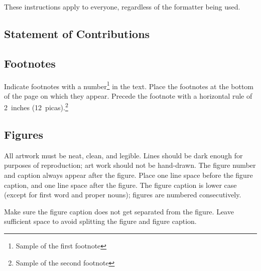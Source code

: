 \documentclass{article} %
\begin{document}
These instructions apply to everyone, regardless of the formatter being used.

\subsection{Statement of Contributions}






\subsection{Footnotes}

Indicate footnotes with a number\footnote{Sample of the first footnote} in the
text. Place the footnotes at the bottom of the page on which they appear.
Precede the footnote with a horizontal rule of 2~inches
(12~picas).\footnote{Sample of the second footnote}

\subsection{Figures}

All artwork must be neat, clean, and legible. Lines should be dark
enough for purposes of reproduction; art work should not be
hand-drawn. The figure number and caption always appear after the
figure. Place one line space before the figure caption, and one line
space after the figure. The figure caption is lower case (except for
first word and proper nouns); figures are numbered consecutively.

Make sure the figure caption does not get separated from the figure.
Leave sufficient space to avoid splitting the figure and figure caption.
\end{document}
